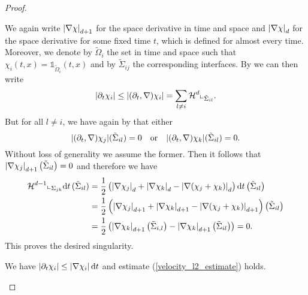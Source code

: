 \begin{proof}
\begin{description}[wide=0pt]
		We again write $ \abs{ \nabla \chi }_{ d + 1 } $ for the space 
		derivative in time and space and $ \abs{ \nabla \chi }_{ d } $ for the 
		space derivative for some fixed time $ t $, which is defined for almost 
		every time. Moreover, we denote by $ \tilde{ \Omega }_{ i } $ the set 
		in time and space such that
		$ \chi_{ i } ( t , x ) = \mathds{ 1 }_{ \tilde{ \Omega }_{ i } } ( t , 
		x ) $
		and by $ \tilde{ \Sigma }_{ i j } $ the corresponding interfaces.
		By  we can then write
		\begin{equation*}
			\abs{ \partial_{ t } \chi_{ i } }
			\leq
			\abs{ ( \partial_{ t } , \nabla ) \chi_{ i } }
			=
			\sum_{ l \neq i }
			\operatorname{\mathcal{H}}^{ d } \llcorner_{ \tilde{ \Sigma }_{ i l } }.
		\end{equation*}
		But for all $ l \neq i $, we have again by 
		 that either 
		\begin{equation*}
			\abs{ ( \partial_{ t } , \nabla ) \chi_{ j } } ( \tilde{ \Sigma }_{ 
				i l } ) = 0 
			\quad \text{or} \quad
			\abs{ ( \partial_{ t } , \nabla ) \chi_{ k } } ( \tilde{ \Sigma }_{ 
				i l } ) = 0.
		\end{equation*}
		Without loss of generality we assume the former. 
		Then it follows that $ \abs{ \nabla \chi_{ j } }_{ d + 1 } \left( 
		\tilde{ \Sigma }_{ i l } \right) = 0 $ and therefore we have
		\begin{align*}
			\operatorname{\mathcal{H}}^{ d - 1 } \llcorner_{ \Sigma_{ j k } } \dd{ t } ( \tilde{ 
			\Sigma 
			}_{ i 
				l } )
			& =
			\frac{ 1 }{ 2 } \left(
			\abs{ \nabla \chi_{ j } }_{ d }
			+
			\abs{ \nabla \chi_{ k } }_{ d }
			-
			\abs{ \nabla ( \chi_{ j } + \chi_{ k } ) }_{ d }
			\right)
			\dd{ t }
			\left( \tilde{ \Sigma }_{ i l }\right)
			\\
			& = 
			\frac{ 1 }{ 2 } \left(
			\abs{ \nabla \chi_{ j } }_{ d+1 }
			+
			\abs{ \nabla \chi_{ k } }_{ d +1 }
			-
			\abs{ \nabla ( \chi_{ j } + \chi_{ k } ) }_{ d+ 1 }
			\right) \left( \tilde{ \Sigma }_{ i l } \right)
			\\
			& = 
			\frac{ 1 }{ 2 } \left( 
			\abs{ \nabla \chi_{ k } }_{ d + 1 } \left( \tilde{ \Sigma } _{ i , 
			l } \right)
			-
			\abs{ \nabla \chi_{ k } }_{ d + 1 } 
			\left( \tilde{ \Sigma } _{ i l } \right)
			\right)
			= 0.		
		\end{align*}
		This proves the desired singularity.
		
		\item[Step 4:] We have 
		$ \abs{ \partial_{ t } \chi_{ i } } 
		\leq \abs{ \nabla \chi_{ i } } \dd{ t } $ and estimate 
		(\ref{velocity_l2_estimate}) holds.
		

\end{description}
\end{proof}
